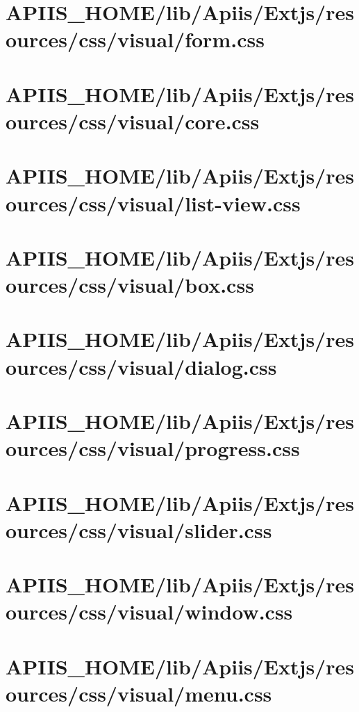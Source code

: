 \section{APIIS\_HOME/lib/Apiis/Extjs/resources/css/visual/form.css} 
\section{APIIS\_HOME/lib/Apiis/Extjs/resources/css/visual/core.css} 
\section{APIIS\_HOME/lib/Apiis/Extjs/resources/css/visual/list-view.css} 
\section{APIIS\_HOME/lib/Apiis/Extjs/resources/css/visual/box.css} 
\section{APIIS\_HOME/lib/Apiis/Extjs/resources/css/visual/dialog.css} 
\section{APIIS\_HOME/lib/Apiis/Extjs/resources/css/visual/progress.css} 
\section{APIIS\_HOME/lib/Apiis/Extjs/resources/css/visual/slider.css} 
\section{APIIS\_HOME/lib/Apiis/Extjs/resources/css/visual/window.css} 
\section{APIIS\_HOME/lib/Apiis/Extjs/resources/css/visual/menu.css} 
